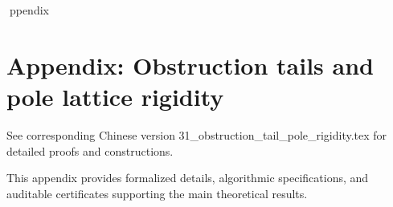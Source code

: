 ppendix

\section*{Appendix: Obstruction tails and pole lattice rigidity}

See corresponding Chinese version 31_obstruction_tail_pole_rigidity.tex for detailed proofs and constructions.

This appendix provides formalized details, algorithmic specifications, and auditable certificates supporting the main theoretical results.
